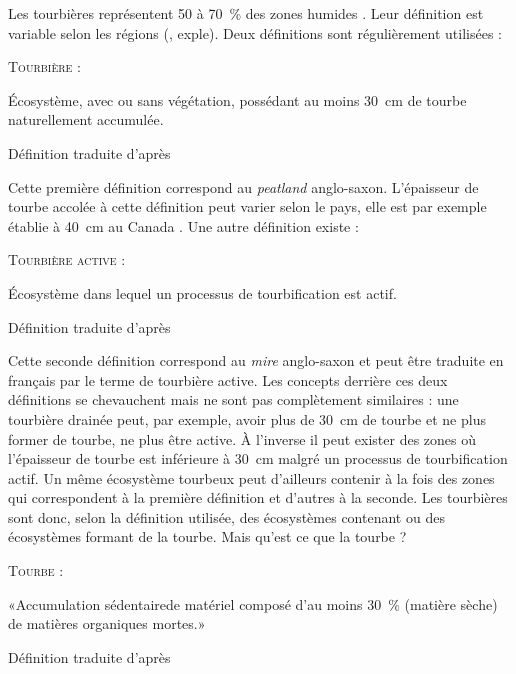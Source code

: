 Les tourbières représentent 50 à \SI{70}{\percent} des zones humides \cite{joosten2002}.
Leur définition est variable selon les régions (\plop, exple).
Deux définitions sont régulièrement utilisées :

\begin{pdef}
\textsc{Tourbière} :

Écosystème, avec ou sans végétation, possédant au moins \SI{30}{\cm} de tourbe naturellement accumulée.

\hfill {\scriptsize Définition traduite d'après \citet{joosten2002}}
\end{pdef}
Cette première définition correspond au \textit{peatland} anglo-saxon.
L'épaisseur de tourbe accolée à cette définition peut varier selon le pays, elle est par exemple établie à \SI{40}{\cm} au Canada \citep{nationalwetlandsworkinggroup1997}.
Une autre définition existe :

\begin{pdef}
\textsc{Tourbière active} :

Écosystème dans lequel un processus de tourbification est actif.

\hfill {\scriptsize Définition traduite d'après \citet{joosten2002}}
\end{pdef}
Cette seconde définition correspond au \textit{mire} anglo-saxon et peut être traduite en français par le terme de tourbière active.
Les concepts derrière ces deux définitions se chevauchent mais ne sont pas complètement similaires : une tourbière drainée peut, par exemple, avoir plus de \SI{30}{cm} de tourbe et ne plus former de tourbe, ne plus être active.
À l'inverse il peut exister des zones où l'épaisseur de tourbe est inférieure à \SI{30}{cm} malgré un processus de tourbification actif.
Un même écosystème tourbeux peut d'ailleurs contenir à la fois des zones qui correspondent à la première définition et d'autres à la seconde.
Les tourbières sont donc, selon la définition utilisée, des écosystèmes contenant ou des écosystèmes formant de la tourbe.
Mais qu'est ce que la tourbe ?

\begin{pdef}
\textsc{Tourbe} :

«Accumulation sédentaire\footnotemark de matériel composé d'au moins \SI{30}{\percent} (matière sèche) de matières organiques mortes.»

\hfill {\scriptsize Définition traduite d'après \citet{joosten2002}}
\end{pdef}

